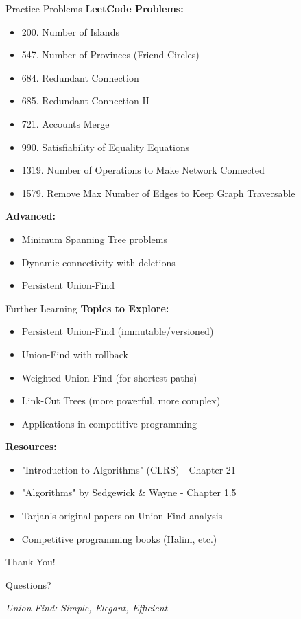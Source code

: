\documentclass[aspectratio=169]{beamer}
\begin{document}
\begin{frame}{Practice Problems}
  \textbf{LeetCode Problems:}
  \begin{itemize}
    \item 200. Number of Islands
    \item 547. Number of Provinces (Friend Circles)
    \item 684. Redundant Connection
    \item 685. Redundant Connection II
    \item 721. Accounts Merge
    \item 990. Satisfiability of Equality Equations
    \item 1319. Number of Operations to Make Network Connected
    \item 1579. Remove Max Number of Edges to Keep Graph Traversable
  \end{itemize}

  \vspace{0.5cm}
  \textbf{Advanced:}
  \begin{itemize}
    \item Minimum Spanning Tree problems
    \item Dynamic connectivity with deletions
    \item Persistent Union-Find
  \end{itemize}
\end{frame}

\begin{frame}{Further Learning}
  \textbf{Topics to Explore:}
  \begin{itemize}
    \item Persistent Union-Find (immutable/versioned)
    \item Union-Find with rollback
    \item Weighted Union-Find (for shortest paths)
    \item Link-Cut Trees (more powerful, more complex)
    \item Applications in competitive programming
  \end{itemize}

  \vspace{0.5cm}
  \textbf{Resources:}
  \begin{itemize}
    \item "Introduction to Algorithms" (CLRS) - Chapter 21
    \item "Algorithms" by Sedgewick \& Wayne - Chapter 1.5
    \item Tarjan's original papers on Union-Find analysis
    \item Competitive programming books (Halim, etc.)
  \end{itemize}
\end{frame}

\begin{frame}
  \begin{center}
    {\Huge Thank You!}

    \vspace{1cm}
    {\Large Questions?}

    \vspace{1cm}
    \textit{Union-Find: Simple, Elegant, Efficient}
  \end{center}
\end{frame}
\end{document}
